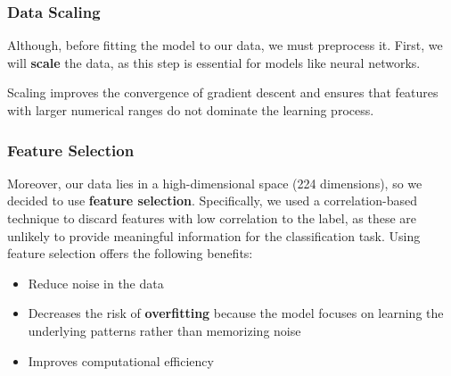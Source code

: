 \documentclass{beamer}
\begin{document}
\begin{frame}
\frametitle{Data Scaling}
Although, before fitting the model to our data, we must preprocess it. First, we will \textbf{scale} the data, as this step is essential for models like neural networks.
\vspace{0.5cm}

Scaling improves the convergence of gradient descent and ensures that features with larger numerical ranges do not dominate the learning process.

\end{frame}

\begin{frame}
\frametitle{Feature Selection}
Moreover, our data lies in a high-dimensional space (224 dimensions), so we decided to use \textbf{feature selection}. Specifically, we used a correlation-based technique to discard features with low correlation to the label, as these are unlikely to provide meaningful information for the classification task. Using feature selection offers the following benefits:
\vspace{0.5cm}
\begin{itemize}
    \item Reduce noise in the data
    \item Decreases the risk of \textbf{overfitting} because the model focuses on learning the underlying patterns rather than memorizing noise
    \item Improves computational efficiency
\end{itemize}
\end{frame}
\end{document}
